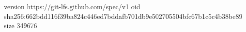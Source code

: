 version https://git-lfs.github.com/spec/v1
oid sha256:662bdd116f39ba824c446ed7bddafb701db9e502705504bfc67b1c5c4b38be89
size 349676
